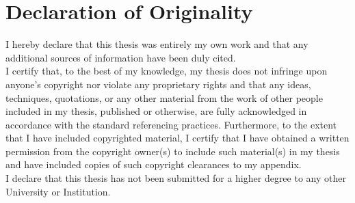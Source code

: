 \section*{Declaration of Originality}

I hereby declare that this thesis was entirely my own work and that any additional sources of information have been duly cited.\\

I certify that, to the best of my knowledge, my thesis does not infringe upon anyone's copyright nor violate any proprietary rights and that any ideas, techniques, quotations, or any other material from the work of other people included in my thesis, published or otherwise, are fully acknowledged in accordance with the standard referencing practices. Furthermore, to the extent that I have included copyrighted material, I certify that I have obtained a written permission from the copyright owner(s) to include such material(s) in my thesis and have included copies of such copyright clearances to my appendix.\\
 
I declare that this thesis has not been submitted for a higher degree to any other University or Institution.